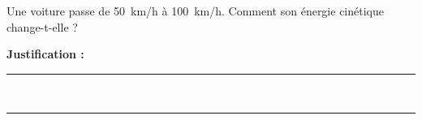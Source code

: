 Une voiture passe de \qty{50}{km/h} à \qty{100}{km/h}. Comment son énergie cinétique change-t-elle ?

\choices

\noindent\textbf{Justification :} \hrulefill \\[2.5ex]
\rule{\linewidth}{0.4pt} \\[2.5ex]
\rule{\linewidth}{0.4pt}
\vfill
